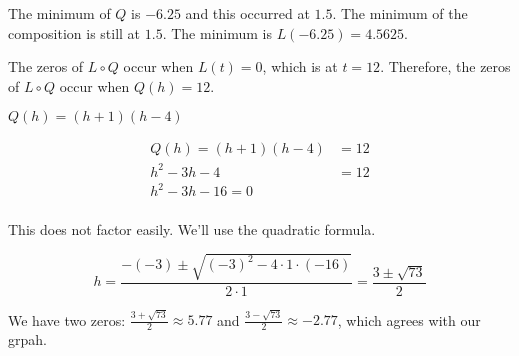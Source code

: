 \documentclass{ximera}
\begin{document}
The minimum of $Q$ is $-6.25$ and this occurred at $1.5$.  The minimum of the composition is still at $1.5$.  The minimum is $L(-6.25) = 4.5625$.




The zeros of $L \circ Q$ occur when $L(t) = 0$, which is at $t = 12$.  Therefore, the zeros of $L \circ Q$ occur when $Q(h) = 12$.





$Q(h) = (h+1)(h-4)$



\begin{align*}
Q(h) = (h+1)(h-4)     &  = 12  \\
h^2 - 3h - 4      & = 12   \\
h^2 - 3h - 16 = 0  \\
\end{align*}

This does not factor easily.  We'll use the quadratic formula.


\[  h = \frac{-(-3) \pm \sqrt{(-3)^2 - 4 \cdot 1 \cdot (-16)}}{2 \cdot 1}  = \frac{3 \pm \sqrt{73}}{2}     \]


We have two zeros: $\frac{3 + \sqrt{73}}{2}  \approx 5.77$ and $\frac{3 - \sqrt{73}}{2} \approx -2.77$, which agrees with our grpah.
\end{document}
